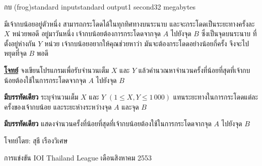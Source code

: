 \documentclass[11pt,a4paper]{article}
\begin{document}
\begin{problem}{กบ (frog)}{standard input}{standard output}{1 second}{32 megabytes}

มีเจ้ากบน้อยอยู่ตัวหนึ่ง สามารถกระโดดได้ในทุกทิศทางบนระนาบ และจะกระโดดเป็นระยะทางครั้งละ $X$ หน่วยพอดี อยู่มาวันหนึ่ง เจ้ากบน้อยต้องการกระโดดจากจุด $A$ ไปยังจุด $B$ ซึ่งเป็นจุดบนระนาบ ที่ตั้งอยู่ห่างกัน $Y$ หน่วย เจ้ากบน้อยอยากให้คุณช่วยหาว่า มันจะต้องกระโดดอย่างน้อยกี่ครั้ง จึงจะไปหยุดที่จุด $B$ พอดี

\underline{\textbf{โจทย์}} จงเขียนโปรแกรมเพื่อรับจำนวนเต็ม $X$ และ $Y$ แล้วคำนวณหาจำนวนครั้งที่น้อยที่สุดที่เจ้ากบน้อยต้องใช้ในการกระโดดจากจุด $A$ ไปยังจุด $B$

\InputFile

\textbf{มีบรรทัดเดียว} ระบุจำนวนเต็ม $X$ และ $Y$ $(1 \leq X,Y \leq 1\,000)$ แทนระยะทางในการกระโดดแต่ละครั้งของเจ้ากบน้อย และระยะห่างระหว่างจุด $A$ และจุด $B$

\OutputFile

\textbf{มีบรรทัดเดียว} แสดงจำนวนครั้งที่น้อยที่สุดที่เจ้ากบน้อยต้องใช้ในการกระโดดจากจุด $A$ ไปยังจุด $B$

\Examples 

\begin{example}
%
%
\end{example}

\Source

โจทย์โดย: สุธี เรืองวิเศษ

การแข่งขัน IOI Thailand League เดือนสิงหาคม 2553

\end{problem}
\end{document}

